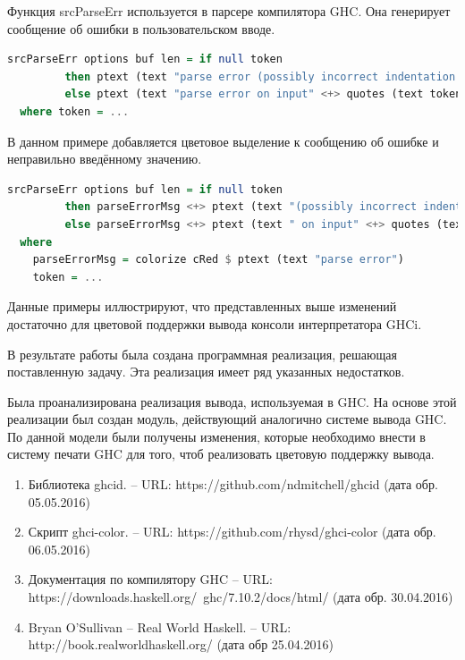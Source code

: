 Функция srcParseErr используется в парсере компилятора GHC. Она генерирует сообщение об ошибки в пользовательском вводе.

\begin{lstlisting}[language=Haskell]
srcParseErr options buf len = if null token
         then ptext (text "parse error (possibly incorrect indentation or mismatched brackets)")
         else ptext (text "parse error on input" <+> quotes (text token))
  where token = ...    
\end{lstlisting}

В данном примере добавляется цветовое выделение к сообщению об ошибке и неправильно введённому значению.

\begin{lstlisting}[language=Haskell]
srcParseErr options buf len = if null token
         then parseErrorMsg <+> ptext (text "(possibly incorrect indentation or mismatched brackets)")
         else parseErrorMsg <+> ptext (text " on input" <+> quotes (text token))
  where 
    parseErrorMsg = colorize cRed $ ptext (text "parse error")
    token = ...    
\end{lstlisting}

Данные примеры иллюстрируют, что представленных выше изменений достаточно для цветовой поддержки вывода консоли интерпретатора GHCi.

\Conc
В результате работы была создана программная реализация, решающая поставленную задачу. Эта реализация имеет ряд указанных недостатков.

Была проанализирована реализация вывода, используемая в GHC. На основе этой реализации был создан модуль, действующий аналогично системе вывода GHC. По данной модели были получены изменения, которые необходимо внести в систему печати GHC для того, чтоб реализовать цветовую поддержку вывода.

\begin{enumerate}
  \item Библиотека ghcid. -- URL: https://github.com/ndmitchell/ghcid (дата обр. 05.05.2016)
  \item Скрипт ghci-color. -- URL: https://github.com/rhysd/ghci-color (дата обр. 06.05.2016)
  \item Документация по компилятору GHC -- URL: https://downloads.haskell.org/~ghc/7.10.2/docs/html/ (дата обр. 30.04.2016)
  \item Bryan O'Sullivan -- Real World Haskell. -- URL: http://book.realworldhaskell.org/ (дата обр 25.04.2016)
\end{enumerate}

